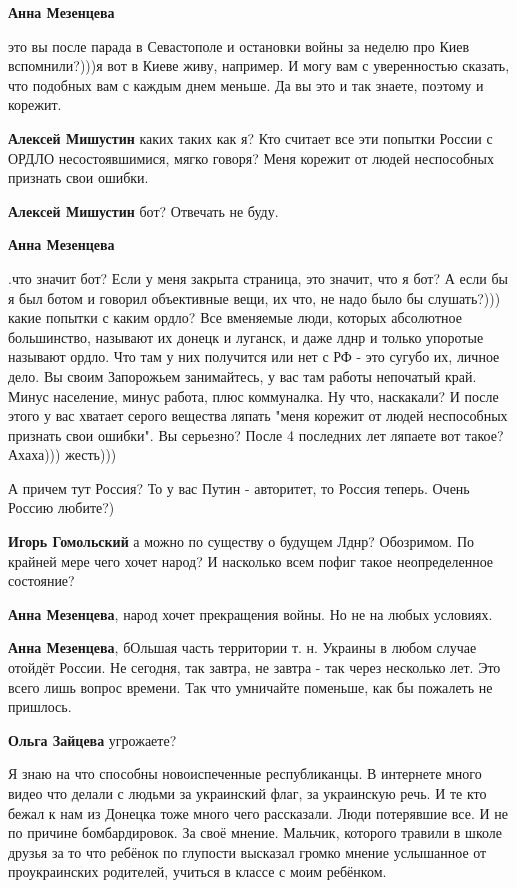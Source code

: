 \begin{itemize}
\begin{itemize}
\textbf{Анна Мезенцева} 

это вы после парада в Севастополе и остановки войны за неделю про Киев
вспомнили?)))я вот в Киеве живу, например. И могу вам с уверенностью сказать, что
подобных вам с каждым днем меньше. Да вы это и так знаете, поэтому и корежит.


\textbf{Алексей Мишустин} каких таких как я? Кто считает все эти попытки России с ОРДЛО несостоявшимися, мягко говоря?
Меня корежит от людей неспособных признать свои ошибки.

\textbf{Алексей Мишустин} бот? Отвечать не буду.

\textbf{Анна Мезенцева}

.что значит бот? Если у меня закрыта страница, это значит, что я бот? А если бы я
был ботом и говорил объективные вещи, их что, не надо было бы слушать?))) какие
попытки с каким ордло? Все вменяемые люди, которых абсолютное
большинство, называют их донецк и луганск, и даже лднр и только упоротые называют
ордло. Что там у них получится или нет с РФ - это сугубо их, личное дело. Вы своим
Запорожьем занимайтесь, у вас там работы непочатый край. Минус население, минус
работа, плюс коммуналка. Ну что, наскакали? И после этого у вас хватает серого
вещества ляпать "меня корежит от людей неспособных признать свои ошибки". Вы
серьезно? После 4 последних лет ляпаете вот такое? Ахаха))) жесть)))


А причем тут Россия? То у вас Путин - авторитет, то Россия теперь. Очень Россию
любите?)

\textbf{Игорь Гомольский} а можно по существу о будущем Лднр? Обозримом. По крайней мере чего хочет народ? И насколько всем пофиг такое неопределенное состояние?

\textbf{Анна Мезенцева}, народ хочет прекращения войны. Но не на любых условиях.

\textbf{Анна Мезенцева}, бОльшая часть территории т. н. Украины в любом случае отойдёт России. Не сегодня, так завтра, не завтра - так через несколько лет. Это всего лишь вопрос времени. Так что умничайте поменьше, как бы пожалеть не пришлось.

\textbf{Ольга Зайцева} угрожаете? 

Я знаю на что способны новоиспеченные республиканцы. В интернете много видео
что делали с людьми за украинский флаг, за украинскую речь. И те кто бежал к
нам из Донецка тоже много чего рассказали. Люди потерявшие все. И не по причине
бомбардировок. За своё мнение. Мальчик, которого травили в школе друзья за то
что ребёнок по глупости высказал громко мнение услышанное от проукраинских
родителей, учиться в классе с моим ребёнком.


\end{itemize}
\end{itemize}
